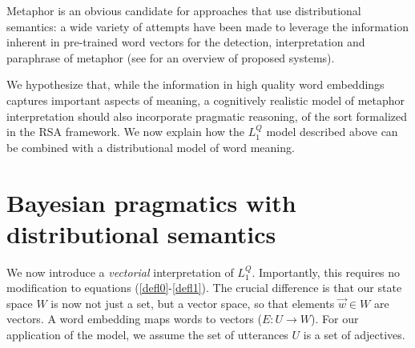 \documentclass[9pt,twocolumn,twoside,lineno]{pnas-new}
\newcommand{\Listener}{L}
\newcommand{\QLONE}{\Listener_{{1}}^{{Q}}}
\begin{document}
		

	Metaphor is an obvious candidate for approaches that use distributional semantics: a wide variety of attempts have been made to leverage the information inherent in pre-trained word vectors for the detection, interpretation and paraphrase of metaphor (see \cite{shutova2016design} for an overview of proposed systems).

	We hypothesize that, while the information in high quality word embeddings captures important aspects of meaning, a cognitively realistic model of metaphor interpretation should also incorporate pragmatic reasoning, of the sort formalized in the RSA framework. We now explain how the $\QLONE$ model described above can be combined with a distributional model of word meaning.

	\section{Bayesian pragmatics with distributional semantics} \label{bayesdist}


	We now introduce a \emph{vectorial} interpretation of $\QLONE$. Importantly, this requires no modification to equations (\ref{defl0}-\ref{defl1}). The crucial difference is that our state space $W$ is now not just a set, but a vector space, so that elements $\overrightarrow{w}\in W$ are vectors. A word embedding maps words to vectors ($E : U\to W$).
	For our application of the model, we assume the set of utterances $U$ is a set of adjectives. 

		
\end{document}
